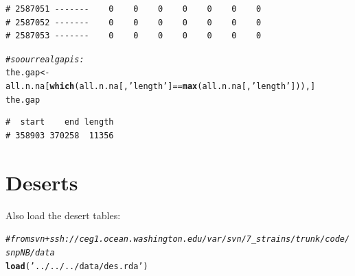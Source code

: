 \documentclass{article}\usepackage[]{graphicx}\usepackage[]{color}
\makeatletter
\newcommand{\hlstr}[1]{\textcolor[rgb]{0.192,0.494,0.8}{#1}}%
\newcommand{\hlcom}[1]{\textcolor[rgb]{0.678,0.584,0.686}{\textit{#1}}}%
\newcommand{\hlopt}[1]{\textcolor[rgb]{0,0,0}{#1}}%
\newcommand{\hlstd}[1]{\textcolor[rgb]{0.345,0.345,0.345}{#1}}%
\newcommand{\hlkwb}[1]{\textcolor[rgb]{0.69,0.353,0.396}{#1}}%
\newcommand{\hlkwd}[1]{\textcolor[rgb]{0.737,0.353,0.396}{\textbf{#1}}}%
\newenvironment{kframe}{%
 \def\at@end@of@kframe{}%
 \ifinner\ifhmode%
  \def\at@end@of@kframe{\end{minipage}}%
  \begin{minipage}{\columnwidth}%
 \fi\fi%
 \def\FrameCommand##1{\hskip\@totalleftmargin \hskip-\fboxsep
 \colorbox{shadecolor}{##1}\hskip-\fboxsep
     \hskip-\linewidth \hskip-\@totalleftmargin \hskip\columnwidth}%
 \MakeFramed {\advance\hsize-\width
   \@totalleftmargin\z@ \linewidth\hsize
   \@setminipage}}%
 {\par\unskip\endMakeFramed%
 \at@end@of@kframe}
\newenvironment{knitrout}{}{} %
\makeatother
\begin{document}
\begin{knitrout}
\begin{kframe}
\begin{verbatim}
# 2587051 -------    0    0    0    0    0    0    0
# 2587052 -------    0    0    0    0    0    0    0
# 2587053 -------    0    0    0    0    0    0    0
\end{verbatim}
\begin{alltt}
\hlcom{# so our real gap is:}
\hlstd{the.gap} \hlkwb{<-} \hlstd{all.n.na[}\hlkwd{which}\hlstd{(all.n.na[,}\hlstr{'length'}\hlstd{]}\hlopt{==}\hlkwd{max}\hlstd{(all.n.na[,}\hlstr{'length'}\hlstd{])),]}
\hlstd{the.gap}
\end{alltt}
\begin{verbatim}
#  start    end length 
# 358903 370258  11356
\end{verbatim}
\end{kframe}
\end{knitrout}

\section{Deserts}

Also load the desert tables:

\begin{knitrout}\footnotesize
{}\color{fgcolor}\begin{kframe}
\begin{alltt}
\hlcom{# from svn+ssh://ceg1.ocean.washington.edu/var/svn/7_strains/trunk/code/snpNB/data}
\hlkwd{load}\hlstd{(}\hlstr{'../../../data/des.rda'}\hlstd{)}
\end{alltt}
\end{kframe}
\end{knitrout}
\end{document}
